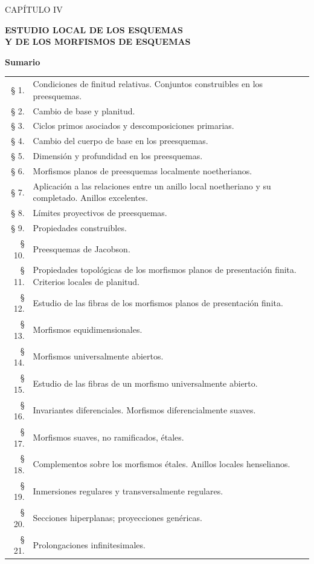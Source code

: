 \cleardoublepage
{}
\thispagestyle{plain}

\begin{center}
{\Large CAPÍTULO IV}

\vspace{1.5cm}
{\LARGE\bfseries ESTUDIO LOCAL DE LOS ESQUEMAS\\[0.3em]
Y DE LOS MORFISMOS DE ESQUEMAS}

\vspace{1.5cm}
{\large\bfseries Sumario}
\end{center}

\medskip
\begin{tabular}{@{}r p{}}
§ 1. & Condiciones de finitud relativas. Conjuntos construibles en los preesquemas.\\
§ 2. & Cambio de base y planitud.\\
§ 3. & Ciclos primos asociados y descomposiciones primarias.\\
§ 4. & Cambio del cuerpo de base en los preesquemas.\\
§ 5. & Dimensión y profundidad en los preesquemas.\\
§ 6. & Morfismos planos de preesquemas localmente noetherianos.\\
§ 7. & Aplicación a las relaciones entre un anillo local noetheriano y su completado.
Anillos excelentes.\\
§ 8. & Límites proyectivos de preesquemas.\\
§ 9. & Propiedades construibles.\\
§ 10. & Preesquemas de Jacobson.\\
§ 11.\footnotemark[1] & Propiedades topológicas de los morfismos planos de presentación finita.
Criterios locales de planitud.\\
§ 12. & Estudio de las fibras de los morfismos planos de presentación finita.\\
§ 13. & Morfismos equidimensionales.\\
§ 14. & Morfismos universalmente abiertos.\\
§ 15. & Estudio de las fibras de un morfismo universalmente abierto.\\
§ 16. & Invariantes diferenciales. Morfismos diferencialmente suaves.\\
§ 17. & Morfismos suaves, no ramificados, étales.\\
§ 18. & Complementos sobre los morfismos étales. Anillos locales henselianos.\\
§ 19. & Inmersiones regulares y transversalmente regulares.\\
§ 20. & Secciones hiperplanas; proyecciones genéricas.\\
§ 21. & Prolongaciones infinitesimales.\\
\end{tabular}

